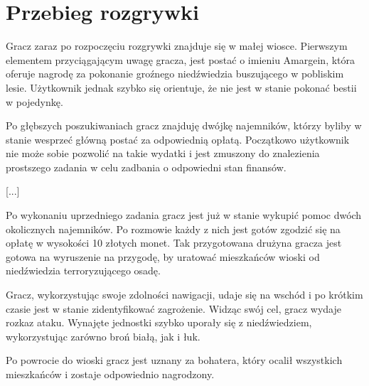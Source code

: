 \section{Przebieg rozgrywki}
Gracz zaraz po rozpoczęciu rozgrywki znajduje się w małej wiosce. Pierwszym
elementem przyciągającym uwagę gracza, jest postać o imieniu Amargein, która oferuje
nagrodę za pokonanie groźnego niedźwiedzia buszującego w pobliskim lesie. Użytkownik jednak
szybko się orientuje, że nie jest w stanie pokonać bestii w pojedynkę.

Po głębszych poszukiwaniach gracz znajduję dwójkę najemników, którzy byliby w stanie
wesprzeć główną postać za odpowiednią opłatą. Początkowo użytkownik nie może sobie
pozwolić na takie wydatki i jest zmuszony do znalezienia prostszego zadania
w celu zadbania o odpowiedni stan finansów.

[...]

Po wykonaniu uprzedniego zadania gracz jest już w stanie wykupić pomoc dwóch okolicznych
najemników. Po rozmowie każdy z nich jest gotów zgodzić się na opłatę w wysokości 10 złotych monet.
Tak przygotowana drużyna gracza jest gotowa na wyruszenie na przygodę, by uratować
mieszkańców wioski od niedźwiedzia terroryzującego osadę.

Gracz, wykorzystując swoje zdolności nawigacji, udaje się na wschód i po krótkim czasie jest w stanie zidentyfikować zagrożenie.
Widząc swój cel, gracz wydaje rozkaz ataku. Wynajęte jednostki szybko uporały się z niedźwiedziem, wykorzystując zarówno
broń białą, jak i łuk.

Po powrocie do wioski gracz jest uznany za bohatera, który ocalił wszystkich mieszkańców i zostaje odpowiednio nagrodzony.

